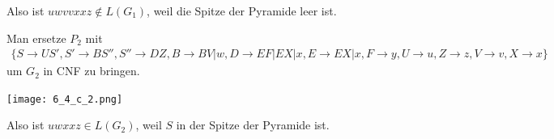\documentclass[10pt,a4paper]{article}
\begin{document}
Also ist $uwvvxxz \not\in L(G_{1})$, weil die Spitze der Pyramide leer ist.

Man ersetze $P_{2}$ mit
\begin{align*}
  \{ S \rightarrow US', S' \rightarrow BS'', S'' \rightarrow DZ, B \rightarrow BV | w, D \rightarrow EF | EX | x, E \rightarrow EX | x, F \rightarrow y, U \rightarrow u, Z \rightarrow z, V \rightarrow v, X \rightarrow x \}
\end{align*}
um $G_{2}$ in CNF zu bringen.

\texttt{[image: 6\_4\_c\_2.png]}

Also ist $uwxxz \in L(G_{2})$, weil $S$ in der Spitze der Pyramide ist.
\end{document}
